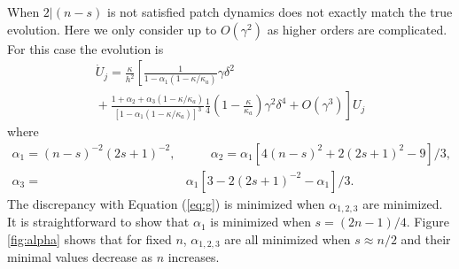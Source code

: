 \documentclass[12pt,a4paper]{article}
\begin{document}
When $2|(n-s)$ is not satisfied patch dynamics does not exactly match the true evolution. Here we only consider up to $O(\gamma^2)$ as higher orders are complicated. For this case the evolution is
\begin{multline}
\dot{U}_j=\frac{\kappa}{h^2}\left[\frac{1}{1-\alpha_1(1-\kappa/\kappa_a)}\gamma\delta^2\right.\\
\left.{}+\frac{1+\alpha_2+\alpha_3(1-\kappa/\kappa_a)}{[1-\alpha_1(1-\kappa/\kappa_a)]^3}\frac{1}{4}\left(1-\frac{\kappa}{\kappa_a}\right)\gamma^2\delta^4 +O(\gamma^3)\right]U_j
\end{multline}
where
\begin{align}
\alpha_1=(n-s)^{-2}(2s+1)^{-2},&\qquad\alpha_2=\alpha_1[4(n-s)^2+2(2s+1)^2-9]/3,\nonumber\\
\alpha_3=&\alpha_1[3-2(2s+1)^{-2}-\alpha_1]/3.
\end{align}
The discrepancy with Equation (\ref{eq:g}) is minimized when $\alpha_{1,2,3}$ are minimized. It is straightforward to show that $\alpha_1$ is minimized when $s=(2n-1)/4$. Figure \ref{fig:alpha} shows that for fixed $n$, $\alpha_{1,2,3}$ are all minimized when $s\approx n/2$ and their minimal values decrease as $n$ increases. 
\end{document}
